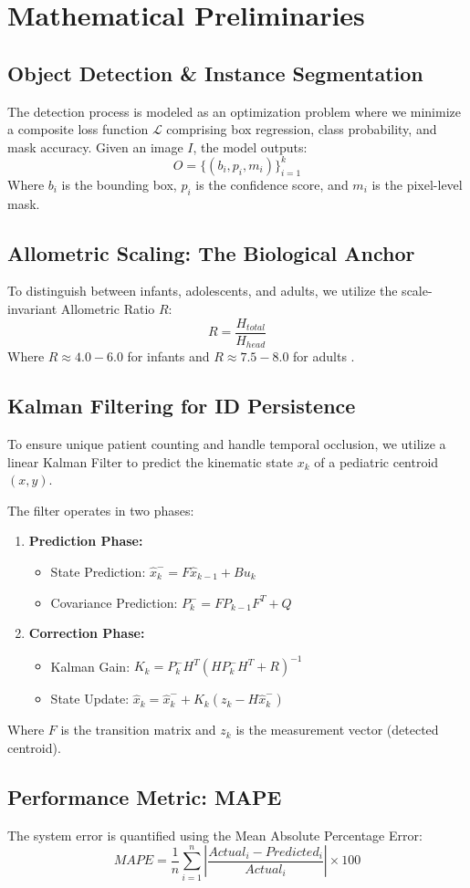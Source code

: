 \chapter{Mathematical Preliminaries}

\section{Object Detection \& Instance Segmentation}
The detection process is modeled as an optimization problem where we minimize a composite loss function $\mathcal{L}$ comprising box regression, class probability, and mask accuracy. Given an image $I$, the model outputs:
\begin{equation}
    O = \{ (b_i, p_i, m_i) \}_{i=1}^k
\end{equation}
Where $b_i$ is the bounding box, $p_i$ is the confidence score, and $m_i$ is the pixel-level mask.

\section{Allometric Scaling: The Biological Anchor}
To distinguish between infants, adolescents, and adults, we utilize the scale-invariant Allometric Ratio $R$:
\begin{equation}
    R = \frac{H_{total}}{H_{head}}
\end{equation}
Where $R \approx 4.0 - 6.0$ for infants and $R \approx 7.5 - 8.0$ for adults \parencite{mlinaric2024}.

\section{Kalman Filtering for ID Persistence}
To ensure unique patient counting and handle temporal occlusion, we utilize a linear Kalman Filter to predict the kinematic state $x_k$ of a pediatric centroid $(x, y)$. 

The filter operates in two phases:
\begin{enumerate}
    \item \textbf{Prediction Phase:}
    \begin{itemize}
        \item State Prediction: $\hat{x}_k^- = F\hat{x}_{k-1} + Bu_k$
        \item Covariance Prediction: $P_k^- = FP_{k-1}F^T + Q$
    \end{itemize}
    \item \textbf{Correction Phase:}
    \begin{itemize}
        \item Kalman Gain: $K_k = P_k^-H^T(HP_k^-H^T + R)^{-1}$
        \item State Update: $\hat{x}_k = \hat{x}_k^- + K_k(z_k - H\hat{x}_k^-)$
    \end{itemize}
\end{enumerate}
Where $F$ is the transition matrix and $z_k$ is the measurement vector (detected centroid).

\section{Performance Metric: MAPE}
The system error is quantified using the Mean Absolute Percentage Error:
\begin{equation}
    MAPE = \frac{1}{n} \sum_{i=1}^{n} \left| \frac{Actual_i - Predicted_i}{Actual_i} \right| \times 100
\end{equation}
